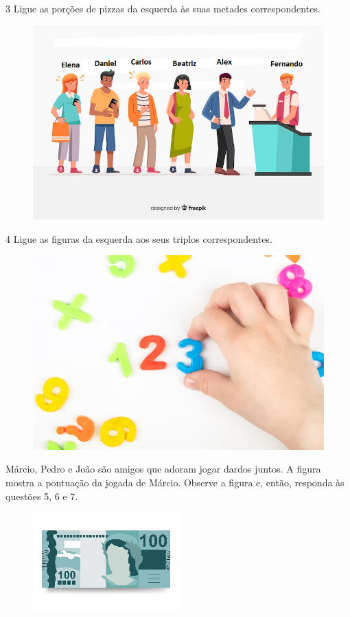 \pagebreak
\num{3} Ligue as porções de pizzas da esquerda às suas metades correspondentes.

\begin{figure}[htpb!]
\includegraphics[width=\textwidth]{./media/image106.png}
\end{figure}

\pagebreak
\num{4} Ligue as figuras da esquerda aos seus triplos correspondentes.

\begin{figure}[htpb!]
\includegraphics[width=\textwidth]{./media/image107.png}
\end{figure}

\pagebreak
Márcio, Pedro e João são amigos que adoram jogar dardos juntos. A figura mostra a pontuação da jogada de Márcio. Observe a figura e, então, responda às questões 5, 6 e 7.

\begin{figure}[htpb!]
\centering
\includegraphics[width=.5\textwidth]{./media/image108.png}
\end{figure}

